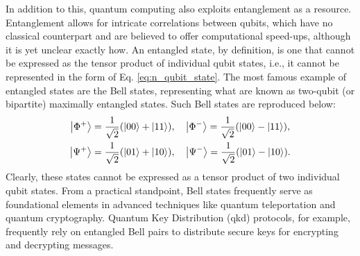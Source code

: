 In addition to this, quantum computing also exploits entanglement as a resource. Entanglement allows for intricate correlations between qubits, which have no classical counterpart and are believed to offer computational speed-ups, although it is yet unclear exactly how. An entangled state, by definition, is one that cannot be expressed as the tensor product of individual qubit states, i.e., it cannot be represented in the form of Eq. \ref{eq:n_qubit_state}. The most famous example of entangled states are the Bell states, representing what are known as two-qubit (or bipartite) maximally entangled states. Such Bell states are reproduced below:
\begin{equation} %
  \begin{aligned}
  \ket{\Phi^+} &= \frac{1}{\sqrt{2}}(\ket{00} + \ket{11}), \quad
  \ket{\Phi^-} = \frac{1}{\sqrt{2}}(\ket{00} - \ket{11}), \\
  \ket{\Psi^+} &= \frac{1}{\sqrt{2}}(\ket{01} + \ket{10}), \quad
  \ket{\Psi^-} = \frac{1}{\sqrt{2}}(\ket{01} - \ket{10}).
  \end{aligned}
\end{equation}
Clearly, these states cannot be expressed as a tensor product of two individual qubit states. From a practical standpoint, Bell states frequently serve as foundational elements in advanced techniques like quantum teleportation and quantum cryptography. Quantum Key Distribution (\acrshort{qkd}) protocols, for example, frequently rely on entangled Bell pairs to distribute secure keys for encrypting and decrypting messages.

